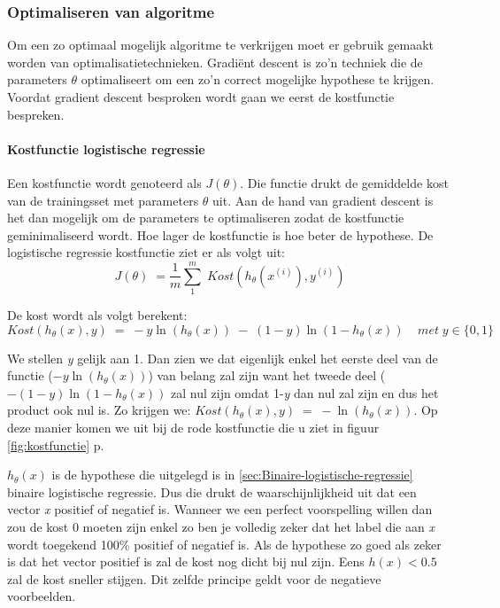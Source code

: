 \subsubsection{Optimaliseren van algoritme}
\label{sec:Optimaliseren-algoritme}
Om een zo optimaal mogelijk algoritme te verkrijgen moet er gebruik gemaakt worden van optimalisatietechnieken. Gradiënt descent is zo'n techniek die de parameters $\theta$ optimaliseert om een zo'n correct mogelijke hypothese te krijgen. Voordat gradient descent besproken wordt gaan we eerst de kostfunctie bespreken. 

\paragraph{Kostfunctie logistische regressie}
\label{par:kostfunctie-log}
Een kostfunctie wordt genoteerd als $J(\theta)$. Die functie drukt de gemiddelde kost van de trainingsset met parameters $\theta$ uit. Aan de hand van gradient descent is het dan mogelijk om de parameters te optimaliseren zodat de kostfunctie geminimaliseerd wordt. Hoe lager de kostfunctie is hoe beter de hypothese.
De logistische regressie kostfunctie ziet er als volgt uit: 
$$ 
J(\theta) \; = \frac{1}{m}\sum_{1}^{m} \;   Kost (h_{\theta}(x^{(i)}), y^{(i)} )  
$$

De kost wordt als volgt berekent:
$$Kost (h_{\theta}(x), y) \; = \; -y\ln(h_{\theta}(x)) \;- \;(1-y) \ln(1-h_{\theta}(x))  \;\;\;\; met \; y \in \{0,1\}$$

We stellen \textit{y} gelijk aan 1. Dan zien we dat eigenlijk enkel het eerste deel van de functie ($-y\ln(h_{\theta}(x))$) van belang zal zijn want het tweede deel ($- (1-y) \ln(1-h_{\theta}(x))$ zal nul zijn omdat 1-\textit{y} dan nul zal zijn en dus het product ook nul is. Zo krijgen we: 
\newline $Kost (h_{\theta}(x), y) \; = \; -\ln(h_{\theta}(x))$. Op deze manier komen we uit bij de rode kostfunctie die u ziet in figuur \ref{fig:kostfunctie} p\pageref{fig:kostfunctie}.

$h_{\theta}(x)$ is de hypothese die uitgelegd is in \ref{sec:Binaire-logistische-regressie} binaire logistische regressie. Dus die drukt de waarschijnlijkheid uit dat een vector \textit{x} positief of negatief is. Wanneer we een perfect voorspelling willen dan zou de kost 0 moeten zijn enkel zo ben je volledig zeker dat het label die aan \textit{x} wordt toegekend 100\% positief of negatief is. Als de hypothese zo goed als zeker is dat het vector positief is zal de kost nog dicht bij nul zijn. Eens $h(x) < 0.5$ zal de kost sneller stijgen. Dit zelfde principe geldt voor de negatieve voorbeelden. 

